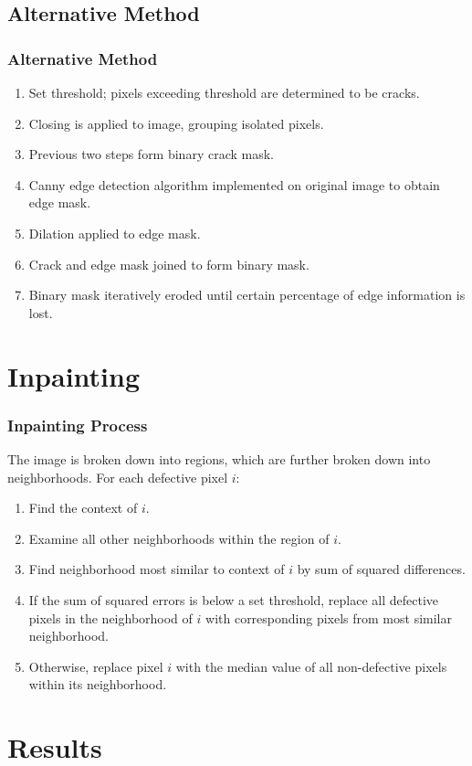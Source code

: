 \documentclass{beamer}
\begin{document}
\subsection[Alternative Method]{Alternative Method}

\begin{frame}
\frametitle{Alternative Method}
\begin{enumerate}
\item Set threshold; pixels exceeding threshold are determined to be cracks.
\item Closing is applied to image, grouping isolated pixels.
\item Previous two steps form binary crack mask.
\item Canny edge detection algorithm implemented on original image to obtain edge mask.
\item Dilation applied to edge mask.
\item Crack and edge mask joined to form binary mask.
\item Binary mask iteratively eroded until certain percentage of edge information is lost.
\end{enumerate}
\end{frame}

\section[Inpainting]{Inpainting}

\begin{frame}
\frametitle{Inpainting Process}
The image is broken down into regions, which are further broken down into neighborhoods. For each defective pixel $i$:
\begin{enumerate}
\item Find the context of $i$.
\item Examine all other neighborhoods within the region of $i$.
\item Find neighborhood most similar to context of $i$ by sum of squared differences.
\item If the sum of squared errors is below a set threshold, replace all defective pixels in the neighborhood of $i$ with corresponding pixels from most similar neighborhood.
\item Otherwise, replace pixel $i$ with the median value of all non-defective pixels within its neighborhood.
\end{enumerate}
\end{frame}

\section[Results]{Results}
\end{document}
